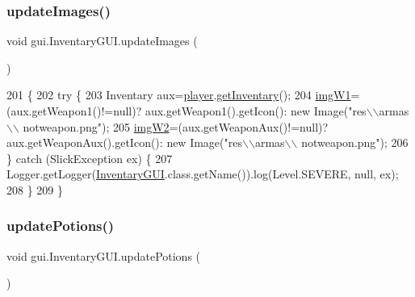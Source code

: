 \subsubsection{\texorpdfstring{update\+Images()}{updateImages()}}
{\footnotesize\ttfamily void gui.\+Inventary\+G\+U\+I.\+update\+Images (\begin{DoxyParamCaption}{ }\end{DoxyParamCaption})\hspace{0.3cm}{\ttfamily [inline]}}


\begin{DoxyCode}
201                           \{
202         \textcolor{keywordflow}{try} \{
203             Inventary aux=\mbox{\hyperlink{classgui_1_1_inventary_g_u_i_ac788453bd94ba3fa6875e67fed92e1d7}{player}}.\mbox{\hyperlink{classentities_1_1_subject_a38fe8f9b3cc9f4c551163ae1f09f480b}{getInventary}}();
204             \mbox{\hyperlink{classgui_1_1_inventary_g_u_i_a4d623cf53fbc8fbb7bdd65ab3633f4f8}{imgW1}}=(aux.getWeapon1()!=null)? aux.getWeapon1().getIcon(): \textcolor{keyword}{new} Image(\textcolor{stringliteral}{"res\(\backslash\)\(\backslash\)armas\(\backslash\)\(\backslash\)
      notweapon.png"});
205             \mbox{\hyperlink{classgui_1_1_inventary_g_u_i_ae9efdba87b5117e72cd1be1c8722775c}{imgW2}}=(aux.getWeaponAux()!=null)? aux.getWeaponAux().getIcon(): \textcolor{keyword}{new} Image(\textcolor{stringliteral}{"res\(\backslash\)\(\backslash\)armas\(\backslash\)\(\backslash\)
      notweapon.png"});
206         \} \textcolor{keywordflow}{catch} (SlickException ex) \{
207             Logger.getLogger(\mbox{\hyperlink{classgui_1_1_inventary_g_u_i_aef89de77a50cd8f064bd17700951715b}{InventaryGUI}}.class.getName()).log(Level.SEVERE, null, ex);
208         \}
209 \}
\end{DoxyCode}
\mbox{\label{classgui_1_1_inventary_g_u_i_a0f9da0a1505dc29af480ff2c7e41e4d4}} 
\subsubsection{\texorpdfstring{update\+Potions()}{updatePotions()}}
{\footnotesize\ttfamily void gui.\+Inventary\+G\+U\+I.\+update\+Potions (\begin{DoxyParamCaption}{ }\end{DoxyParamCaption})\hspace{0.3cm}{\ttfamily [inline]}}


